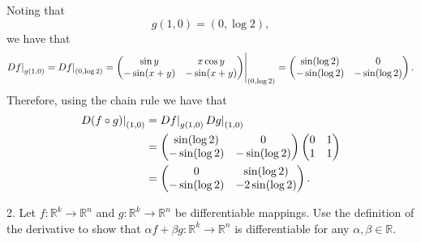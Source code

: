\documentclass{article}
\newcommand{\0}{\mathbf{0}}
\newcommand{\R}{\mathbb{R}}
\begin{document}
%
Noting that
%
\begin{equation*}
    g(1, 0) = (0, \log 2)
    ,
\end{equation*}
%
we have that
%
\begin{equation*}
    \eval[0]{D f}_{g(1, 0)}
    =
    \eval[0]{D f}_{(0, \log 2)}
    =
    \eval{
        \begin{pmatrix}
            \sin y & x \cos y \\
            - \sin(x + y) & - \sin(x + y)
        \end{pmatrix}
    }_{(0, \log 2)}
    =
        \begin{pmatrix}
            \sin(\log 2) & 0 \\
            - \sin(\log 2) & - \sin(\log 2)
        \end{pmatrix}
    .
\end{equation*}
%
Therefore, using the chain rule we have that
%
\begin{align*}
    \eval[0]{D(f \circ g)}_{(1, 0)}
    &= \eval[0]{D f}_{g(1, 0)} \eval[0]{D g}_{(1, 0)}
    \\
    &=
        \begin{pmatrix}
            \sin(\log 2) & 0 \\
            - \sin(\log 2) & - \sin(\log 2)
        \end{pmatrix}
        \begin{pmatrix}
            0 & 1 \\
            1 & 1
        \end{pmatrix}
        \\
    & =
        \begin{pmatrix}
            0 & \sin(\log 2) \\
            - \sin(\log 2) & - 2 \sin(\log 2)
        \end{pmatrix}
        .
\end{align*}

\newpage

2. Let $f: \R^k \to \R^n$ and $g: \R^k \to \R^n$ be differentiable
mappings. Use the definition of the derivative to show that $\alpha f
+ \beta g: \R^k \to \R^n$ is differentiable for any $\alpha, \beta
\in \R$.
\end{document}
